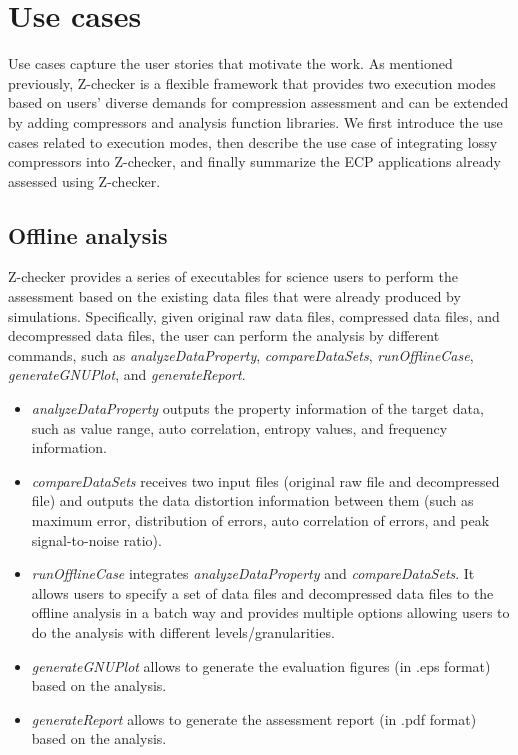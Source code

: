\section{Use cases}

Use cases capture the user stories that motivate the work. As mentioned previously, Z-checker is a flexible 
framework that provides two execution modes based on users' diverse demands for compression assessment and
can be extended by adding compressors and analysis function libraries. 
We first introduce the use cases related to execution modes, then describe the use case of integrating lossy compressors into Z-checker, and finally summarize the ECP applications already assessed using Z-checker.

\subsection{Offline analysis}

Z-checker provides a series of executables for science users to perform the assessment based on the existing data files that were already produced by simulations. Specifically, given original raw data files, compressed data files, and decompressed data files, the user can perform the analysis by different commands, such as \emph{analyzeDataProperty}, \emph{compareDataSets}, \emph{runOfflineCase}, \emph{generateGNUPlot}, and \emph{generateReport}.
\begin{itemize}
  \item \emph{analyzeDataProperty} outputs the property information of the target data, such as value range, auto correlation, entropy values, and frequency information.
  \item \emph{compareDataSets} receives two input files (original raw file and decompressed file) and outputs the data distortion information between them (such as maximum error, distribution of errors, auto correlation of errors, and peak signal-to-noise ratio).
  \item \emph{runOfflineCase} integrates \emph{analyzeDataProperty} and \emph{compareDataSets}. It allows users to specify a set of data files and decompressed data files to the offline analysis in a batch way and provides multiple options allowing users to do the analysis with different levels/granularities.
  \item \emph{generateGNUPlot} allows to generate the evaluation figures (in .eps format) based on the analysis.
  \item \emph{generateReport} allows to generate the assessment report (in .pdf format) based on the analysis.
\end{itemize}

